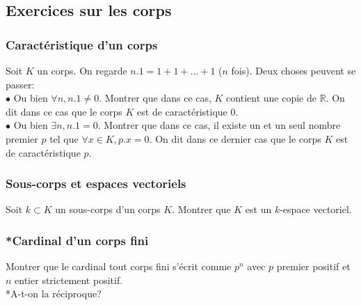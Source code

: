 \documentclass{article}
\begin{document}
\subsection{Exercices sur les corps}
\subsubsection{Caract\'eristique d'un corps}
Soit $K$ un corps. On regarde $n.1=1+1+\dots+1$ ($n$ fois). Deux choses peuvent se passer:\\
$\bullet$ Ou bien $\forall n, n.1\neq 0$. Montrer que dans ce cas, $K$ contient une copie de $\mathbb{R}$. On dit dans ce cas que le corps $K$ est de caract\'eristique $0$.\\
$\bullet$ Ou bien $\exists n, n.1=0$. Montrer que dans ce cas, il existe un et un seul nombre premier $p$ tel que $\forall x\in K, p.x=0$. On dit dans ce dernier cas que le corps $K$ est de caract\'eristique $p$.
\subsubsection{Sous-corps et espaces vectoriels}
Soit $k\subset K$ un sous-corps d'un corps $K$. Montrer que $K$ est un $k$-espace vectoriel.
\subsubsection{*Cardinal d'un corps fini}
Montrer que le cardinal tout corps fini s'\'ecrit comme $p^n$ avec $p$ premier positif et $n$ entier strictement positif.\\
*A-t-on la r\'eciproque?
\end{document}
